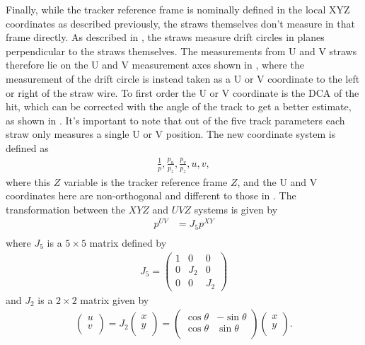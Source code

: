 Finally, while the tracker reference frame is nominally defined in the local XYZ coordinates as described previously, the straws themselves don't measure in that frame directly. As described in , the straws measure drift circles in planes perpendicular to the straws themselves. The measurements from U and V straws therefore lie on the U and V measurement axes shown in , where the measurement of the drift circle is instead taken as a U or V coordinate to the left or right of the straw wire. To first order the U or V coordinate is the DCA of the hit, which can be corrected with the angle of the track to get a better estimate, as shown in . It's important to note that out of the five track parameters each straw only measures a single U or V position. The new coordinate system is defined as
        \begin{align} \label{eq:trackermeasurementframe}
            \frac{1}{p}, \frac{p_{u}}{p_{z}}, \frac{p_{v}}{p_{z}}, u, v,
        \end{align}
where this $Z$ variable is the tracker reference frame $Z$, and the U and V coordinates here are non-orthogonal and different to those in . The transformation between the $XYZ$ and $UVZ$ systems is given by
    \begin{align}
        p^{UV} &= J_{5} p^{XY} \\
    \end{align}
where $J_{5}$ is a $5 \times 5$ matrix defined by
        \begin{align}
            J_{5} = 
            \begin{pmatrix}
                1 & 0 & 0 \\
                0 & J_{2} & 0 \\
                0 & 0 & J_{2}
            \end{pmatrix}
        \end{align}
and $J_{2}$ is a $2 \times 2$ matrix given by
        \begin{align}
            \begin{pmatrix}
                u \\
                v \\
            \end{pmatrix} =
            J_{2}
            \begin{pmatrix}
                x \\
                y \\
            \end{pmatrix} =
            \begin{pmatrix}
                \cos{\theta} & -\sin{\theta} \\
                \cos{\theta} & \sin{\theta} \\
            \end{pmatrix}
            \begin{pmatrix}
                x \\
                y \\
            \end{pmatrix}.
        \end{align}
